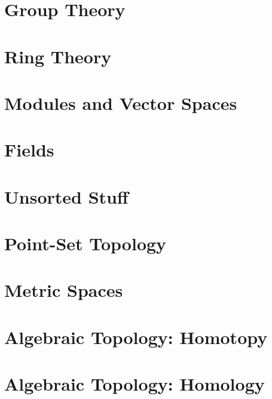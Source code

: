 \documentclass[oneside]{book}                                                  %
\newcommand*{\TOPPATH}{books}
\newcommand*{\PATH}{\TOPPATH/}
\newcounter{endpage}
\begin{document}
        \part{Group Theory}
            
        \part{Ring Theory}
            
        \part{Modules and Vector Spaces}
           
        \part{Fields}
            
        \part{Unsorted Stuff}
            
            
            
            
            
    \clearpage

    \setcounter{endpage}{\thepage}
        \label{book:Topology}%
        \renewcommand{\PATH}{\TOPPATH/Topology}
        \setcounter{page}{\value{endpage}}
        \part{Point-Set Topology}
            
        \part{Metric Spaces}
        \part{Algebraic Topology: Homotopy}
            
        \part{Algebraic Topology: Homology}
\end{document}
